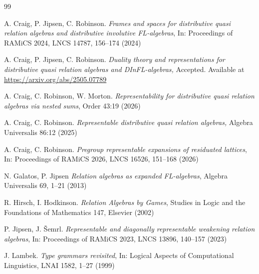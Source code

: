 \documentclass[a4paper]{article} %
\begin{document}
\begin{thebibliography}{99}

A. Craig, P. Jipsen, C. Robinson.
\newblock \emph{Frames and spaces for distributive quasi relation algebras and distributive involutive FL-algebras},
\newblock In: Proceedings of RAMiCS 2024, 
\newblock LNCS 14787, 156--174  (2024)

A. Craig, P. Jipsen, C. Robinson.
\newblock \emph{Duality theory and representations for distributive quasi relation algebras and DInFL-algebras,}
\newblock Accepted. Available at \url{https://arxiv.org/abs/2505.07789}


A. Craig, C. Robinson, W. Morton. 
\newblock \emph{Representability for distributive quasi relation algebras via nested sums},
\newblock Order 43:19 (2026)

 A. Craig, C. Robinson. 
\newblock \emph{Representable distributive quasi relation algebras,}
\newblock Algebra Universalis 86:12 (2025)


A. Craig, C. Robinson.
\newblock \emph{Pregroup representable expansions of residuated lattices},
\newblock In: Proceedings of RAMiCS 2026,
\newblock LNCS 16526, 151--168 (2026)

N. Galatos, P. Jipsen 
\newblock \emph{Relation algebras as expanded FL-algebras},
\newblock Algebra Universalis 69, 1--21 (2013) 

R. Hirsch, I. Hodkinson. 
\newblock \emph{Relation Algebras by Games},
\newblock Studies in Logic and the Foundations of Mathematics 147, Elsevier (2002)


P. Jipsen, J. \v{S}emrl. 
\newblock \emph{Representable and diagonally representable weakening relation algebras}, 
\newblock In: Proceedings of RAMiCS 2023, 
\newblock LNCS 13896, 140--157 (2023)

J. Lambek.
\newblock \emph{Type grammars revisited},
\newblock In: Logical Aspects of Computational Linguistics, LNAI 1582, 1--27 (1999)


\end{thebibliography}
\end{document}
